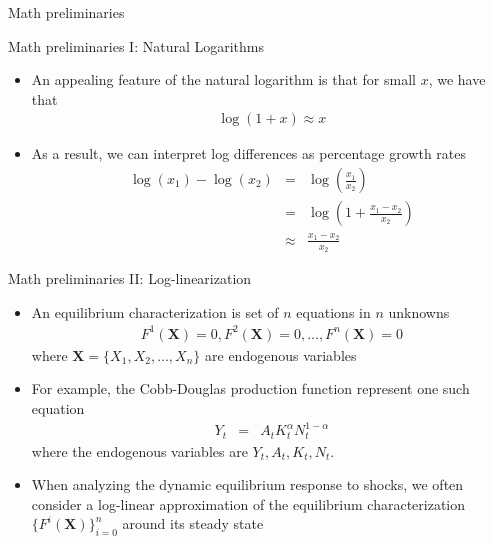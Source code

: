\documentclass[9pt,xcolor={dvipsnames}]{beamer}
\newcommand{\bit}{\begin{itemize}}
\newcommand{\eit}{\end{itemize}}
\newcommand{\bc}{\color{blue}}
\begin{document}
\begin{frame}

\begin{center}
	\huge Math preliminaries \normalfont
\end{center}

\end{frame}


\begin{frame}{Math preliminaries I: Natural Logarithms}

\bit
\setlength\itemsep{1.5em}

\item An appealing feature of the natural logarithm is that for small $x$, we have that
\begin{eqnarray}
\log (1+x) \approx x \nonumber
\end{eqnarray}

\item As a result, we can interpret log differences as percentage growth rates
\begin{eqnarray}
\log (x_1)-\log (x_2) &=& \log \left(\frac{x_1}{x_2}\right) \nonumber \\
&=& \log \left(1+\frac{x_1-x_2}{x_2}\right) \nonumber \\
&\approx& \frac{x_1-x_2}{x_2} \nonumber
\end{eqnarray}

\eit

\end{frame}

\begin{frame}{Math preliminaries II: Log-linearization}

\bit
\setlength\itemsep{2em}

\item An equilibrium characterization is set of $n$ equations in $n$ unknowns
\begin{eqnarray}
F^1(\mathbf{X}) = 0, F^2(\mathbf{X}) = 0,..., F^n(\mathbf{X}) = 0 \nonumber
\end{eqnarray}
where $\mathbf{X}=\{X_{1}, X_{2}, ..., X_{n}\}$ are endogenous variables


\item For example, the Cobb-Douglas production function represent one such equation
\begin{eqnarray}
Y_t &=& A_t K_t^{\alpha}N_t^{1-\alpha} \nonumber
\end{eqnarray}
where the endogenous variables are $Y_t, A_t, K_{t}, N_t$.

\item When analyzing the dynamic equilibrium response to shocks, we often consider a {\bc log-linear approximation} of the equilibrium characterization $\{F^i(\mathbf{X})\}^{n}_{i=0}$ around its {\bc steady state}
\eit

\end{frame}
\end{document}
